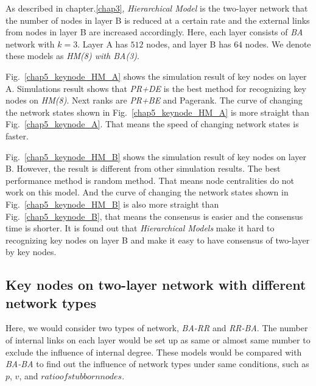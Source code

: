 As described in chapter.\ref{chap3}, \textit{Hierarchical Model} is the two-layer network that the number of nodes in layer B is reduced at a certain rate and the external links from nodes in layer B  are increased accordingly.
Here, each layer consists of \textit{BA} network with $k=3$. Layer A has $512$ nodes, and layer B has $64$ nodes. We denote these models as \textit{HM(8) with BA(3)}.

Fig.~\ref{chap5_keynode_HM_A} shows the simulation result of key nodes on layer A. Simulations result shows that \textit{PR+DE} is the best method for recognizing key nodes on \textit{HM(8)}. Next ranks are \textit{PR+BE} and Pagerank. The curve of changing the network states shown in Fig.~\ref{chap5_keynode_HM_A} is more straight than Fig.~\ref{chap5_keynode_A}. That means the speed of changing network states is faster. 

Fig.~\ref{chap5_keynode_HM_B} shows the simulation result of key nodes on layer B. However, the result is different from other simulation results. The best performance method is random method. That means node centralities do not work on this model. And the curve of changing the network states shown in Fig.~\ref{chap5_keynode_HM_B} is also more straight than Fig.~\ref{chap5_keynode_B}, that means the consensus is easier and the consensus time is shorter. It is found out that \textit{Hierarchical Models} make it hard to recognizing key nodes on layer B and make it easy to have consensus of two-layer by key nodes. \\

\subsection{Key nodes on two-layer network with different network types}
Here, we would consider two types of network, \textit{BA-RR} and \textit{RR-BA}. The number of internal links on each layer would be set up as same or almost same number to exclude the influence of internal degree. These models would be compared with \textit{BA-BA} to find out the influence of network types under same conditions, such as $p$, $v$, and $ratio of stubborn nodes$.  

